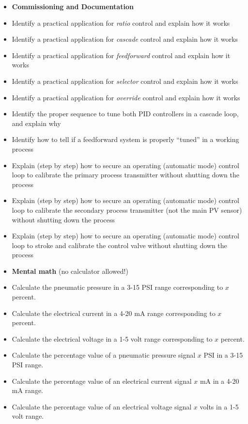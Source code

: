 \documentclass[12pt,a4paper]{article}
\begin{document}
\begin{itemize}
\item{} {\bf Commissioning and Documentation}
\item{} Identify a practical application for {\it ratio} control and explain how it works
\item{} Identify a practical application for {\it cascade} control and explain how it works
\item{} Identify a practical application for {\it feedforward} control and explain how it works
\item{} Identify a practical application for {\it selector} control and explain how it works
\item{} Identify a practical application for {\it override} control and explain how it works
\item{} Identify the proper sequence to tune both PID controllers in a cascade loop, and explain why
\item{} Identify how to tell if a feedforward system is properly ``tuned'' in a working process
\item{} Explain (step by step) how to secure an operating (automatic mode) control loop to calibrate the primary process transmitter without shutting down the process
\item{} Explain (step by step) how to secure an operating (automatic mode) control loop to calibrate the secondary process transmitter (not the main PV sensor) without shutting down the process
\item{} Explain (step by step) how to secure an operating (automatic mode) control loop to stroke and calibrate the control valve without shutting down the process
\end{itemize}

\filbreak

\begin{itemize}
\item{} {\bf Mental math} (no calculator allowed!)
\item{} Calculate the pneumatic pressure in a 3-15 PSI range corresponding to $x$ percent.
\item{} Calculate the electrical current in a 4-20 mA range corresponding to $x$ percent.
\item{} Calculate the electrical voltage in a 1-5 volt range corresponding to $x$ percent.
\item{} Calculate the percentage value of a pneumatic pressure signal $x$ PSI in a 3-15 PSI range.
\item{} Calculate the percentage value of an electrical current signal $x$ mA in a 4-20 mA range.
\item{} Calculate the percentage value of an electrical voltage signal $x$ volts in a 1-5 volt range.
\end{itemize}
\end{document}
